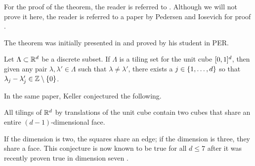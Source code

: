 \documentclass[../thesis.tex]{subfiles}
\begin{document}
For the proof of the theorem, the reader is referred to \cite{iosevichSpectralTilingProperties1998}. 
Although we will not prove it here, the reader is referred to a paper by Pedersen and Iosevich for proof \cite{iosevichSpectralTilingProperties1998}. 

The theorem was initially presented in \cite{ott-heinrichkellerUberLuckenloseErfullung1930} and proved by his student in PER.


\begin{theorem}\label{thrm:keller_tiling}
    Let $\Lambda \subset \mathbb{R}^d$ be a discrete subset. If $\Lambda$ is a tiling set for the unit cube $[0,1]^d$, then given any pair $\lambda, \lambda' \in \Lambda$ such that $\lambda\neq\lambda'$, there exists a $j\in \{1,\dots,d\}$ so that $\lambda_j -\lambda_j' \in \mathbb{Z}\setminus\{0\}$.
\end{theorem}






In the same paper, Keller conjectured the following. %

\begin{conjecture}
    All tilings of $\mathbb{R}^d$ by translations of the unit cube contain two cubes that share an entire $(d-1)$-dimensional face.
\end{conjecture}


If the dimension is two, the squares share an edge; if the dimension is three, they share a face. This conjecture is now known to be true for all $d\leq 7$ after it was recently proven true in dimension seven \cite{brakensiekResolutionKellerConjecture2020}. %
\end{document}
